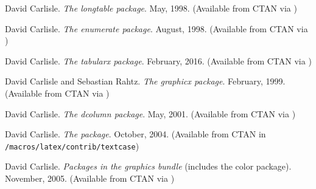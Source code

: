 \begin{thebibliography}{GMS94A}
  David Carlisle.
  \newblock \emph{The longtable package}.
  \newblock May, 1998.
  \newblock (Available from CTAN via
             )

  David Carlisle.
  \newblock \emph{The enumerate package}.
  \newblock August, 1998.
  \newblock (Available from CTAN via
             )

\begin{comment}
\bibitem[Car98d]{REMRESET}
  David Carlisle.
  \newblock \emph{The remreset package}.
  \newblock August, 1998.
  \newblock (Available from CTAN in
             \url{/macros/latex/contrib/carlisle})
\end{comment}

  David Carlisle.
  \newblock \emph{The tabularx package}.
  \newblock February, 2016.
  \newblock (Available from CTAN via
             )

  David Carlisle and Sebastian Rahtz.
  \newblock \emph{The graphicx package}.
  \newblock February, 1999.
  \newblock (Available from CTAN via
             )

  David Carlisle.
  \newblock \emph{The dcolumn package}.
  \newblock May, 2001.
  \newblock (Available from CTAN via
             )

 David Carlisle.
\newblock \emph{The  package}.
\newblock October, 2004.
\newblock (Available from CTAN in 
      \texttt{/macros/latex/contrib/textcase})



  David Carlisle.
  \newblock \emph{Packages in the graphics bundle} (includes the color package).
  \newblock November, 2005.
  \newblock (Available from CTAN via
             )

\begin{comment}
             \bibitem[CK09]{BIDI} Fran\c{c}ois Charette and Vafa
               Khalighi.  \newblock \emph{Bidi: A convenient interface
                 for typesetting bidirectional texts with XeLaTeX}.
               \newblock 2009.  \newblock (Available from CTAN via
               \CTANurl{/macros/latex/contrib/bidi/})
\end{comment}





\end{thebibliography}
